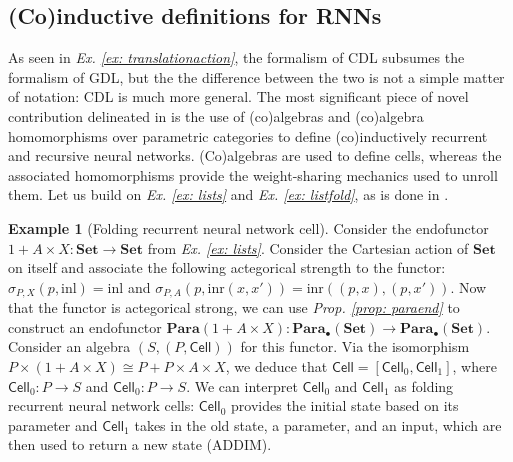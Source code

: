 \documentclass[11pt,a4paper,openright,twoside]{report}
\theoremstyle{plain}
\theoremstyle{definition}
\newtheorem{example}[proposition]{Example}
\begin{document}
\subsection{(Co)inductive definitions for RNNs}

As seen in \textit{Ex. \ref{ex: translationaction}}, the formalism of CDL subsumes the formalism of GDL, but the the difference between the two is not a simple matter of notation: CDL is much more general. The most significant piece of novel contribution delineated in \cite{gavranovicposition} is the use of (co)algebras and (co)algebra homomorphisms over parametric categories to define (co)inductively recurrent and recursive neural networks. (Co)algebras are used to define cells, whereas the associated homomorphisms provide the weight-sharing mechanics used to unroll them. Let us build on \textit{Ex. \ref{ex: lists}} and \textit{Ex. \ref{ex: listfold}}, as is done in \cite{gavranovicposition}.

\begin{example}[Folding recurrent neural network cell]
  \label{ex: frnncell}
  Consider the endofunctor $1 + A \times X: \mathbf{Set} \to \mathbf{Set}$ from \textit{Ex. \ref{ex: lists}}. Consider the Cartesian action of $\mathbf{Set}$ on itself and associate the following actegorical strength to the functor: $\sigma_{P,X}(p,\mathrm{inl}) = \mathrm{inl}$ and  $\sigma_{P,A}(p,\mathrm{inr}(x,x')) = \mathrm{inr}((p,x), (p,x'))$. Now that the functor is actegorical strong, we can use \textit{Prop. \ref{prop: paraend}} to construct an endofunctor $\mathbf{Para}(1 + A \times X): \mathbf{Para}_{\bullet}(\mathbf{Set}) \to \mathbf{Para}_{\bullet}(\mathbf{Set})$. Consider an algebra $(S,(P,\mathsf{Cell}))$ for this functor. Via the isomorphism $P \times (1 + A \times X) \cong P + P \times A \times X$, we deduce that $\mathsf{Cell} = [\mathsf{Cell}_0, \mathsf{Cell}_1]$, where $\mathsf{Cell}_0: P \to S$ and  $\mathsf{Cell}_0: P \to S$. We can interpret $\mathsf{Cell}_0$ and $\mathsf{Cell}_1$ as folding recurrent neural network cells: $\mathsf{Cell}_0$ provides the initial state based on its parameter and $\mathsf{Cell}_1$ takes in the old state, a parameter, and an input, which are then used to return a new state (ADDIM).
\end{example}
\end{document}
